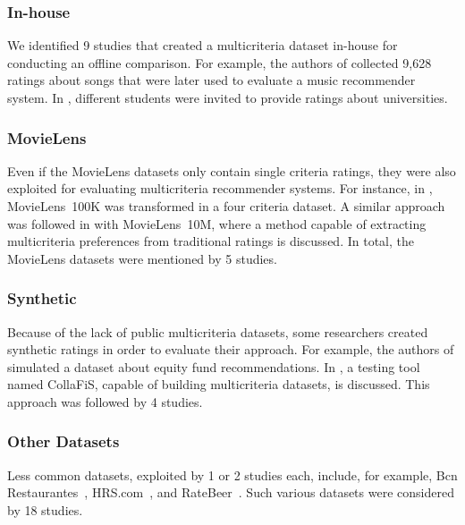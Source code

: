 \subsubsection{In-house}

We identified 9 studies that created a multicriteria dataset in-house for conducting an offline comparison. For example, the authors of  collected 9,628 ratings about songs that were later used to evaluate a music recommender system. In , different students were invited to provide ratings about universities.

\subsubsection{MovieLens}

Even if the MovieLens datasets only contain single criteria ratings, they were also exploited for evaluating multicriteria recommender systems. For instance, in  , MovieLens~100K was transformed in a four criteria dataset. A similar approach was followed in  with MovieLens~10M, where a method capable of extracting multicriteria preferences from traditional ratings  is discussed. In total, the MovieLens datasets were mentioned by 5 studies.

\subsubsection{Synthetic}

Because of the lack of public multicriteria datasets, some researchers created synthetic ratings in order to evaluate their approach. For example, the authors of  simulated a dataset about equity fund recommendations. In , a testing tool named CollaFiS, capable of building multicriteria datasets, is discussed. This approach was followed by 4 studies.

\subsubsection{Other Datasets}

Less common datasets, exploited by 1 or 2 studies each, include, for example, Bcn Restaurantes~, HRS.com~, and RateBeer~. Such various datasets were considered by 18 studies.

